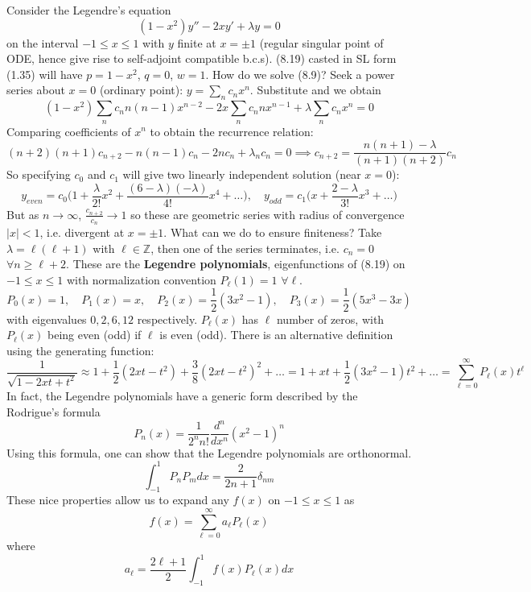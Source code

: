 \documentclass[a4paper]{article}
\begin{document}
\begin{eg}
Consider the Legendre's equation
\begin{equation}
    (1-x^2)y''-2xy'+\lambda y=0\tag{8.19}
\end{equation}
on the interval $-1\leq x\leq 1$ with $y$ finite at $x=\pm 1$ (regular singular point of ODE, hence give rise to self-adjoint compatible b.c.s). (8.19) casted in SL form (1.35) will have $p=1-x^2$, $q=0$, $w=1$. How do we solve (8.9)? Seek a power series about $x=0$ (ordinary point): $y=\sum_nc_nx^n$. Substitute and we obtain
$$(1-x^2)\sum_nc_nn(n-1)x^{n-2}-2x\sum_nc_nnx^{n-1}+\lambda\sum_nc_nx^n=0$$
Comparing coefficients of $x^n$ to obtain the recurrence relation:
\begin{equation}
   (n+2)(n+1)c_{n+2}-n(n-1)c_n-2nc_n+\lambda_nc_n=0\implies c_{n+2}=\frac{n(n+1)-\lambda}{(n+1)(n+2)}c_n\tag{8.20}
\end{equation}
So specifying $c_0$ and $c_1$ will give two linearly independent solution (near $x=0$):
$$y_{even}=c_0\bigg(1+\frac{\lambda}{2!}x^2+\frac{(6-\lambda)(-\lambda)}{4!}x^4+\dots\bigg),\quad y_{odd}=c_1\bigg(x+\frac{2-\lambda}{3!}x^3+\dots\bigg)$$
But as $n\rightarrow\infty$, $\frac{c_{n+2}}{c_n}\rightarrow 1$ so these are geometric series with radius of convergence $|x|<1$, i.e. divergent at $x=\pm 1$. What can we do to ensure finiteness? Take $\lambda=\ell(\ell+1)$ with $\ell\in\mathbb{Z}$, then one of the series terminates, i.e. $c_n=0$ $\forall n\geq\ell+2$. These are the \textbf{Legendre polynomials}, eigenfunctions of (8.19) on $-1\leq x\leq 1$ with normalization convention $P_\ell(1)=1$ $\forall\ell$.
\begin{equation}
    P_0(x)=1,\quad P_1(x)=x,\quad P_2(x)=\frac{1}{2}(3x^2-1),\quad P_3(x)=\frac{1}{2}(5x^3-3x)\tag{8.21a}
\end{equation}
with eigenvalues $0,2,6,12$ respectively. $P_\ell(x)$ has $\ell$ number of zeros, with $P_\ell(x)$ being even (odd) if $\ell$ is even (odd). There is an alternative definition using the generating function:
\begin{equation}
\frac{1}{\sqrt{1-2xt+t^2}}\approx 1+\frac{1}{2}(2xt-t^2)+\frac{3}{8}(2xt-t^2)^2+\dots=1+xt+\frac{1}{2}(3x^2-1)t^2+\dots=\sum_{\ell=0}^\infty P_\ell(x)t^\ell\tag{8.21b}
\end{equation}
In fact, the Legendre polynomials have a generic form described by the Rodrigue's formula
$$P_n(x)=\frac{1}{2^nn!}\frac{d^n}{dx^n}(x^2-1)^n$$
Using this formula, one can show that the Legendre polynomials are orthonormal.
\begin{equation}
    \int_{-1}^1P_nP_mdx=\frac{2}{2n+1}\delta_{nm}\tag{8.22}
\end{equation}
These nice properties allow us to expand any $f(x)$ on $-1\leq x\leq 1$ as
\begin{equation}
    f(x)=\sum_{\ell=0}^\infty a_\ell P_\ell(x)\tag{8.23}
\end{equation}
where
\begin{equation}
    a_\ell=\frac{2\ell+1}{2}\int_{-1}^1f(x)P_\ell(x)dx\tag{8.24}
\end{equation}
\end{eg}
\end{document}
